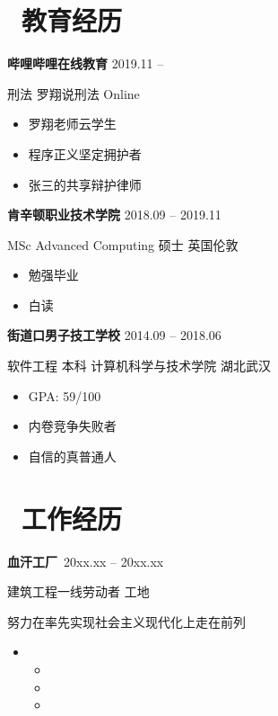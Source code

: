  
\section{\makebox[\widthof{\faGraduationCap}][c]{\color{CVBlue}\faGraduationCap}\  教育经历}

\textbf{哔哩哔哩在线教育} \hfill 2019.11 -- 

刑法 \quad 罗翔说刑法 \hfill Online

\begin{itemize}
  \item 罗翔老师云学生
  \item 程序正义坚定拥护者
  \item 张三的共享辩护律师
\end{itemize}

\textbf{肯辛顿职业技术学院} \hfill 2018.09 -- 2019.11

MSc Advanced Computing \quad 硕士 \hfill {英国伦敦}
\begin{itemize}
  \item 勉强毕业
  \item 白读
\end{itemize}


\textbf{街道口男子技工学校} \hfill 2014.09 -- 2018.06

软件工程 \quad 本科 \quad 计算机科学与技术学院 \hfill 湖北武汉

\begin{itemize}
  \item GPA: 59/100
  \item 内卷竞争失败者
  \item 自信的真普通人
\end{itemize}


\section{\makebox[\widthof{\faGraduationCap}][c]{\color{CVBlue}\faSuitcase}\ 工作经历}

\textbf{血汗工厂}\  \hfill 20xx.xx -- 20xx.xx

建筑工程一线劳动者 \hfill 工地

努力在率先实现社会主义现代化上走在前列

\begin{itemize}
  \item 
  \begin{itemize}
      \item 
      \item 
      \item 
  \end{itemize}

\end{itemize}

